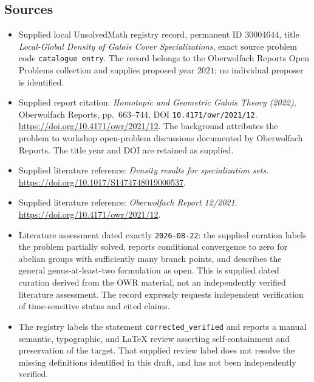 \documentclass[11pt]{article}
\begin{document}
\subsection{Sources}
\begin{itemize}
\item Supplied local UnsolvedMath registry record, permanent ID \(30004644\), title \emph{Local-Global Density of Galois Cover Specializations}, exact source problem code \texttt{catalogue entry}. The record belongs to the Oberwolfach Reports Open Problems collection and supplies proposed year \(2021\); no individual proposer is identified.
\item Supplied report citation: \emph{Homotopic and Geometric Galois Theory (2022)}, Oberwolfach Reports, pp.~663--744, DOI \texttt{10.4171/owr/2021/12}. \url{https://doi.org/10.4171/owr/2021/12}. The background attributes the problem to workshop open-problem discussions documented by Oberwolfach Reports. The title year and DOI are retained as supplied.
\item Supplied literature reference: \emph{Density results for specialization sets}. \url{https://doi.org/10.1017/S1474748019000537}.
\item Supplied literature reference: \emph{Oberwolfach Report 12/2021}. \url{https://doi.org/10.4171/owr/2021/12}.
\item Literature assessment dated exactly \texttt{2026-08-22}: the supplied curation labels the problem partially solved, reports conditional convergence to zero for abelian groups with sufficiently many branch points, and describes the general genus-at-least-two formulation as open. This is supplied dated curation derived from the OWR material, not an independently verified literature assessment. The record expressly requests independent verification of time-sensitive status and cited claims.
\item The registry labels the statement \texttt{corrected\_verified} and reports a manual semantic, typographic, and LaTeX review asserting self-containment and preservation of the target. That supplied review label does not resolve the missing definitions identified in this draft, and has not been independently verified.
\end{itemize}
\end{document}
